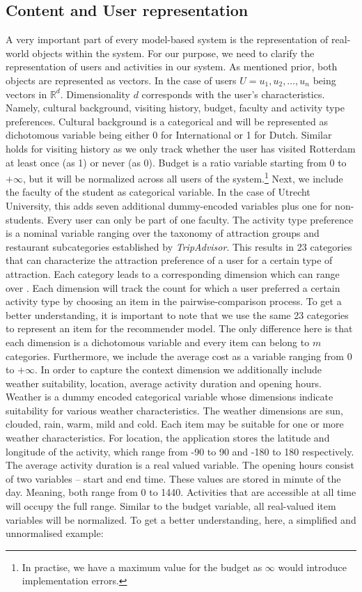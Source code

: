 \documentclass[11pt,a4paper,oneside]{article}
\begin{document}
\subsection{Content and User representation}
A very important part of every model-based system is the representation of real-world objects within the system. For our purpose, we need to clarify the representation of users and activities in our system. As mentioned prior, both objects are represented as vectors. In the case of users $U = {u_1, u_2, \ldots, u_n} $ being vectors in $\mathbb{R}^d$. Dimensionality $d$ corresponds with the user's characteristics. Namely, cultural background, visiting history, budget, faculty and activity type preferences. Cultural background is a categorical and will be represented as dichotomous variable being either 0 for International or 1 for Dutch. Similar holds for visiting history as we only track whether the user has visited Rotterdam at least once (as 1) or never (as 0). Budget is a ratio variable starting from 0 to $+\infty$, but it will be normalized across all users of the system.\footnote{In practise, we have a maximum value for the budget as $\infty$ would introduce implementation errors.} Next, we include the faculty of the student as categorical variable. In the case of Utrecht University, this adds seven additional dummy-encoded variables plus one for non-students. Every user can only be part of one faculty. The activity type preference is a nominal variable ranging over the taxonomy of attraction groups and restaurant subcategories established by \emph{TripAdvisor}.\cite{tripadvisorllc_ContentAPIBusiness_2020} This results in 23 categories that can characterize the attraction preference of a user for a certain type of attraction. Each category leads to a corresponding dimension which can range over . Each dimension will track the count for which a user preferred a certain activity type by choosing an item in the pairwise-comparison process. 
To get a better understanding, it is important to note that we use the same 23 categories to represent an item for the recommender model. The only difference here is that each dimension is a dichotomous variable and every item can belong to $m$ categories. Furthermore, we include the average cost as a variable ranging from 0 to $+\infty$. In order to capture the context dimension we additionally include weather suitability, location, average activity duration and opening hours. Weather is a dummy encoded categorical variable whose dimensions indicate suitability for various weather characteristics. The weather dimensions are sun, clouded, rain, warm, mild and cold. Each item may be suitable for one or more weather characteristics. For location, the application stores the latitude and longitude of the activity, which range from -90 to 90 and -180 to 180 respectively. The average activity duration is a real valued variable. The opening hours consist of two variables -- start and end time. These values are stored in minute of the day. Meaning, both range from 0 to 1440. Activities that are accessible at all time will occupy the full range. Similar to the budget variable, all real-valued item variables will be normalized. To get a better understanding, here, a simplified and unnormalised example:
\end{document}
